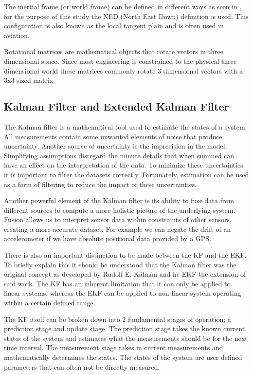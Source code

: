 The inertial frame (or world frame) can be defined in different ways as seen in \cite{soechting1992moving}, for the purpose of this study  the NED (North East Down) definition is used. This configuration is also known as the local tangent plain and is often used in aviation. 

Rotational matrices are mathematical objects that rotate vectors in three dimensional space. Since most engineering is constrained to the physical three dimensional world these matrices commonly rotate 3 dimensional vectors with a 3x3 sized matrix. 


\subsection{Kalman Filter and Extended Kalman Filter}
The Kalman filter is a mathematical tool used to estimate the states of a system. All measurements contain some unwanted elements of noise that produce uncertainty. Another source of uncertainty is the imprecision in the model. Simplifying assumptions disregard the minute details that when summed can have an effect on the interpretation of the data. To minimize these uncertainties it is important to filter the datasets correctly. Fortunately, estimation can be used as a form of filtering to reduce the impact of these uncertainties.    

Another powerful element of the Kalman filter is its ability to fuse data from different sources to compute a more holistic picture of the underlying system. Fusion allows us to interpret sensor data within constraints of other sensors, creating a more accurate dataset. For example we can negate the drift of an accelerometer if we have absolute positional data provided by a GPS. 

There is also an important distinction to be made between the KF and the EKF. To briefly explain this it should be understood that the Kalman filter was the original concept as developed by Rudolf E. Kálmán and he EKF the extension of said work. The KF has an inherent limitation that it can only be applied to linear systems, whereas the EKF can be applied to non-linear system operating within a certain defined range.

The KF itself can be broken down into 2 fundamental stages of operation; a prediction stage and update stage. The prediction stage takes the known current states of the system and estimates what the measurements should be for the next time interval. The measurement stage takes in current measurements and mathematically determines the states. The states of the system are user defined parameters that can often not be directly measured.

